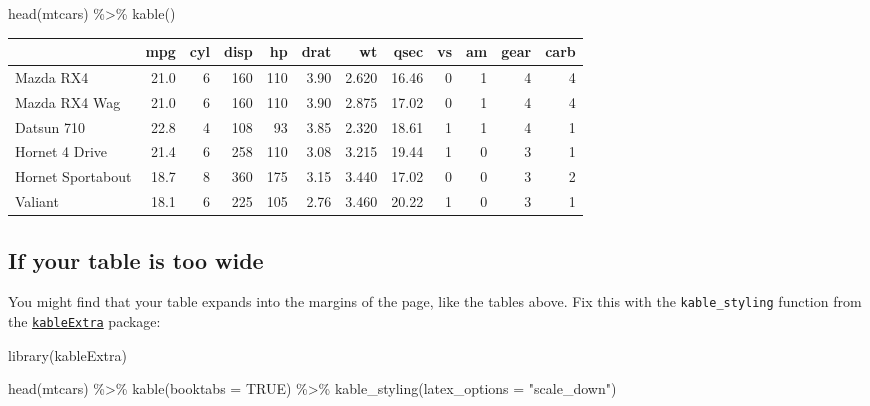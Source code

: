\documentclass[a4paper, nobind]{templates/ociamthesis}
\newenvironment{Shaded}{\begin{snugshade}}{\end{snugshade}}
\newcommand{\AttributeTok}[1]{\textcolor[rgb]{0.77,0.63,0.00}{#1}}
\newcommand{\ConstantTok}[1]{\textcolor[rgb]{0.00,0.00,0.00}{#1}}
\newcommand{\FunctionTok}[1]{\textcolor[rgb]{0.00,0.00,0.00}{#1}}
\newcommand{\NormalTok}[1]{#1}
\newcommand{\SpecialCharTok}[1]{\textcolor[rgb]{0.00,0.00,0.00}{#1}}
\newcommand{\StringTok}[1]{\textcolor[rgb]{0.31,0.60,0.02}{#1}}
\renewenvironment{Shaded}
{
  \vspace{10pt}%
  \begin{snugshade}%
}{%
  \end{snugshade}%
  \vspace{8pt}%
}
\begin{document}
\begin{Shaded}
\begin{Highlighting}[]
\FunctionTok{head}\NormalTok{(mtcars) }\SpecialCharTok{\%\textgreater{}\%} 
  \FunctionTok{kable}\NormalTok{()}
\end{Highlighting}
\end{Shaded}

\begin{tabular}{l|r|r|r|r|r|r|r|r|r|r|r}
\hline
  & mpg & cyl & disp & hp & drat & wt & qsec & vs & am & gear & carb\\
\hline
Mazda RX4 & 21.0 & 6 & 160 & 110 & 3.90 & 2.620 & 16.46 & 0 & 1 & 4 & 4\\
\hline
Mazda RX4 Wag & 21.0 & 6 & 160 & 110 & 3.90 & 2.875 & 17.02 & 0 & 1 & 4 & 4\\
\hline
Datsun 710 & 22.8 & 4 & 108 & 93 & 3.85 & 2.320 & 18.61 & 1 & 1 & 4 & 1\\
\hline
Hornet 4 Drive & 21.4 & 6 & 258 & 110 & 3.08 & 3.215 & 19.44 & 1 & 0 & 3 & 1\\
\hline
Hornet Sportabout & 18.7 & 8 & 360 & 175 & 3.15 & 3.440 & 17.02 & 0 & 0 & 3 & 2\\
\hline
Valiant & 18.1 & 6 & 225 & 105 & 2.76 & 3.460 & 20.22 & 1 & 0 & 3 & 1\\
\hline
\end{tabular}

\hypertarget{if-your-table-is-too-wide}{%
\subsection{If your table is too wide}\label{if-your-table-is-too-wide}}

You might find that your table expands into the margins of the page, like the tables above.
Fix this with the \texttt{kable\_styling} function from the \href{https://haozhu233.github.io/kableExtra/}{\texttt{kableExtra}} package:

\begin{Shaded}
\begin{Highlighting}[]
\FunctionTok{library}\NormalTok{(kableExtra)}

\FunctionTok{head}\NormalTok{(mtcars) }\SpecialCharTok{\%\textgreater{}\%} 
  \FunctionTok{kable}\NormalTok{(}\AttributeTok{booktabs =} \ConstantTok{TRUE}\NormalTok{) }\SpecialCharTok{\%\textgreater{}\%} 
  \FunctionTok{kable\_styling}\NormalTok{(}\AttributeTok{latex\_options =} \StringTok{"scale\_down"}\NormalTok{)}
\end{Highlighting}
\end{Shaded}
\end{document}
